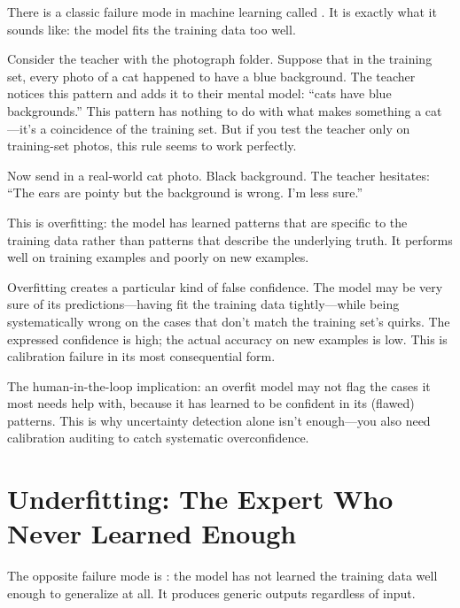 There is a classic failure mode in machine learning called . It is exactly what it sounds like: the model fits the training data too well.

Consider the teacher with the photograph folder. Suppose that in the training set, every photo of a cat happened to have a blue background. The teacher notices this pattern and adds it to their mental model: ``cats have blue backgrounds.'' This pattern has nothing to do with what makes something a cat---it's a coincidence of the training set. But if you test the teacher only on training-set photos, this rule seems to work perfectly.

Now send in a real-world cat photo. Black background. The teacher hesitates: ``The ears are pointy but the background is wrong. I'm less sure.''

This is overfitting: the model has learned patterns that are specific to the training data rather than patterns that describe the underlying truth. It performs well on training examples and poorly on new examples.

\begin{cautionbox}
Overfitting creates a particular kind of false confidence. The model may be very sure of its predictions---having fit the training data tightly---while being systematically wrong on the cases that don't match the training set's quirks. The expressed confidence is high; the actual accuracy on new examples is low. This is calibration failure in its most consequential form.

The human-in-the-loop implication: an overfit model may not flag the cases it most needs help with, because it has learned to be confident in its (flawed) patterns. This is why uncertainty detection alone isn't enough---you also need calibration auditing to catch systematic overconfidence.
\end{cautionbox}

\section{Underfitting: The Expert Who Never Learned Enough}

The opposite failure mode is : the model has not learned the training data well enough to generalize at all. It produces generic outputs regardless of input.


